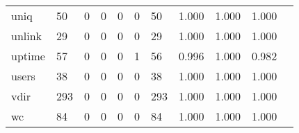 \begin{longtable}{lp{1.2cm}p{1.2cm}p{1.2cm}p{1.2cm}p{1.2cm}p{1.2cm}p{1.2cm}p{1.2cm}p{1.2cm}p{1.2cm}}
uniq      &                                    50 &                                                  0 &                                                  0 &                                                  0 &                                                  0 &                                                 50 &                                         1.000 &                                              1.000 &                                              1.000 \\
unlink    &                                    29 &                                                  0 &                                                  0 &                                                  0 &                                                  0 &                                                 29 &                                         1.000 &                                              1.000 &                                              1.000 \\
uptime    &                                    57 &                                                  0 &                                                  0 &                                                  0 &                                                  1 &                                                 56 &                                         0.996 &                                              1.000 &                                              0.982 \\
users     &                                    38 &                                                  0 &                                                  0 &                                                  0 &                                                  0 &                                                 38 &                                         1.000 &                                              1.000 &                                              1.000 \\
vdir      &                                   293 &                                                  0 &                                                  0 &                                                  0 &                                                  0 &                                                293 &                                         1.000 &                                              1.000 &                                              1.000 \\
wc        &                                    84 &                                                  0 &                                                  0 &                                                  0 &                                                  0 &                                                 84 &                                         1.000 &                                              1.000 &                                              1.000 \\

\end{longtable}
